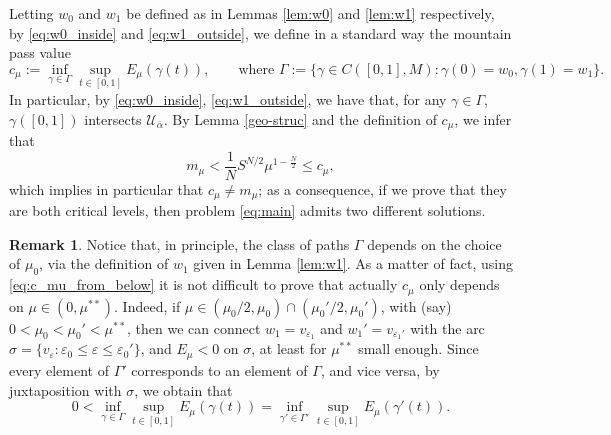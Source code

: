\documentclass[10pt]{article}
\newcommand{\eps}{\varepsilon}
\newcommand{\Ucal}{{\mathcal{U}}}
\theoremstyle{definition}
\newtheorem{remark}[proposition]{Remark}
\numberwithin{equation}{section}
\begin{document}
Letting $w_0$ and $w_1$ be defined as in Lemmas \ref{lem:w0} and \ref{lem:w1} respectively,
by \eqref{eq:w0_inside} and \eqref{eq:w1_outside}, we define in a standard way the mountain pass value
\begin{equation}\label{level:mp}
c_{\mu}:=\inf\limits_{\gamma\in\Gamma} \sup\limits_{t\in[0,1]}E_{\mu}(\gamma(t)),
\qquad\text{where }
\Gamma:=\{\gamma\in C([0,1], M) : \gamma(0)=w_0, \gamma(1)=w_1\}.
\end{equation}
%
In particular, by \eqref{eq:w0_inside}, \eqref{eq:w1_outside}, we have that, for any
$\gamma\in\Gamma$, $\gamma([0,1])$ intersects $\Ucal_{\bar\alpha}$.
By Lemma \ref{geo-struc} and the definition of $c_{\mu}$, we infer that
\begin{equation}\label{eq:c_mu_from_below}
m_{\mu}<\frac{1}{N}S^{N/2}\mu^{1-\frac{N}{2}}\leq c_{\mu},
\end{equation}
which implies in particular that $c_{\mu}\neq m_{\mu}$; as a consequence, if we prove that they are both critical levels, then problem \eqref{eq:main} admits two different solutions.
%
\begin{remark}\label{rmk:c_mu not depend on mu0}
Notice that, in principle, the class of paths $\Gamma$ depends on the choice of $\mu_0$, via the
definition of $w_1$ given in Lemma \ref{lem:w1}. As a matter of fact, using \eqref{eq:c_mu_from_below}
it is not difficult to prove that actually $c_\mu$ only depends on $\mu\in(0,\mu^{**})$. Indeed,
if $\mu \in (\mu_0/2,\mu_0) \cap (\mu_0'/2,\mu_0')$, with (say) $0<\mu_0<\mu_0'<\mu^{**}$, then
we can connect $w_1=v_{\eps_1}$ and $w_1' = v_{\eps_1'}$ with the arc $\sigma = \{v_\eps:\eps_0\le
\eps \le\eps_0'\}$, and $E_\mu<0$ on $\sigma$, at least for $\mu^{**}$ small enough. Since every element of $\Gamma'$ corresponds to an
element of $\Gamma$, and vice versa, by juxtaposition with $\sigma$, we obtain that
\[
0 < \inf\limits_{\gamma\in\Gamma} \sup\limits_{t\in[0,1]}E_{\mu}(\gamma(t)) =
\inf\limits_{\gamma'\in\Gamma'} \sup\limits_{t\in[0,1]}E_{\mu}(\gamma'(t)).
\]
\end{remark}
\end{document}
